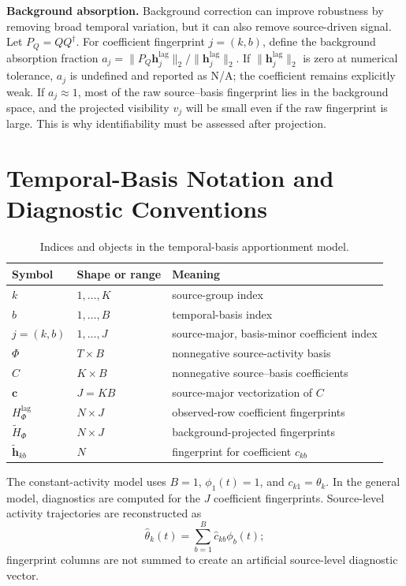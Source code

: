 \noindent\textbf{Background absorption.}
Background correction can improve robustness by removing broad temporal
variation, but it can also remove source-driven signal.  Let \(P_Q=QQ^\dagger\).
For coefficient fingerprint \(j=(k,b)\), define the background absorption
fraction \(a_j=\|P_Q\mathbf h_j^{\mathrm{lag}}\|_2/\|\mathbf h_j^{\mathrm{lag}}\|_2\).
If \(\|\mathbf h_j^{\mathrm{lag}}\|_2\) is zero at numerical tolerance,
\(a_j\) is undefined and reported as N/A; the coefficient remains explicitly
weak.
If \(a_j\approx 1\), most of the raw source--basis fingerprint lies in the
background space, and the projected visibility \(v_j\) will be small even if
the raw fingerprint is large.  This is why identifiability must be assessed
after projection.

\section{Temporal-Basis Notation and Diagnostic Conventions}
\label{app:temporal_basis_notation}

\begin{table}[h]
\centering
\small
\caption{Indices and objects in the temporal-basis apportionment model.}
\label{tab:temporal_basis_notation}
\begin{tabularx}{\columnwidth}{llX}
\toprule
Symbol & Shape or range & Meaning \\
\midrule
\(k\) & \(1,\ldots,K\) & source-group index \\
\(b\) & \(1,\ldots,B\) & temporal-basis index \\
\(j=(k,b)\) & \(1,\ldots,J\) & source-major, basis-minor coefficient index \\
\(\Phi\) & \(T\times B\) & nonnegative source-activity basis \\
\(C\) & \(K\times B\) & nonnegative source--basis coefficients \\
\(\mathbf c\) & \(J=KB\) & source-major vectorization of \(C\) \\
\(H_\Phi^{\mathrm{lag}}\) & \(N\times J\) & observed-row coefficient fingerprints \\
\(\widetilde H_\Phi\) & \(N\times J\) & background-projected fingerprints \\
\(\widetilde{\mathbf h}_{kb}\) & \(N\) & fingerprint for coefficient \(c_{kb}\) \\
\bottomrule
\end{tabularx}
\end{table}

The constant-activity model uses \(B=1\), \(\phi_1(t)=1\), and
\(c_{k1}=\theta_k\).  In the general model, diagnostics are computed for the
\(J\) coefficient fingerprints.  Source-level activity trajectories are
reconstructed as
\[
\widehat\theta_k(t)=\sum_{b=1}^{B}\widehat c_{kb}\phi_b(t);
\]
fingerprint columns are not summed to create an artificial source-level
diagnostic vector.


